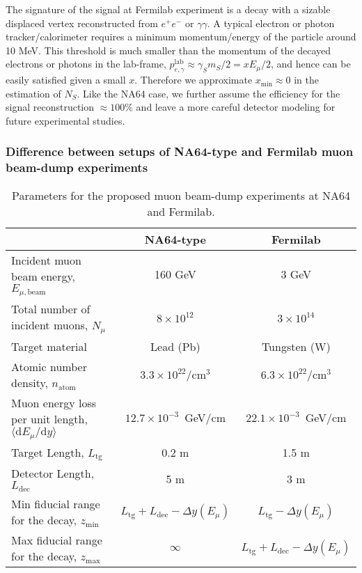 \documentclass[prd,onecolumn,notitlepage,
nofootinbib,aps,tightenlines,
preprintnumbers,amsmath,amssymb,amsfonts,showpacs,superscriptaddress]{revtex4-1}
\renewcommand{\d}{\text{d}}
\renewcommand{\d}{\text{d}}
\newcommand{\yz}[1]{\textcolor{blue}{\textbf{[YZ: #1]}}}
\begin{document}
The signature of the signal at Fermilab experiment is a decay with a sizable displaced vertex reconstructed from $e^+e^-$ or $\gamma \gamma$. A typical electron or photon tracker/calorimeter requires a minimum momentum/energy of the particle around 10 MeV.  This threshold is much smaller than the momentum of the decayed electrons or photons in the lab-frame, $p_{e,\gamma}^\text{lab}\approx \gamma_S m_S/2= x E_\mu/2$, and hence can be easily satisfied given a small $x$.  Therefore we approximate $x_\text{min}\approx 0$ in the estimation of $N_S$. Like the NA64 case, we further assume the efficiency for the signal reconstruction $\approx 100\%$ and leave a more careful detector modeling for future experimental studies.



\subsubsection{Difference between setups of NA64-type and Fermilab muon beam-dump experiments}

\begin{table}[htbp]
   \centering
   \begin{tabular}{@{} lcc @{}} %
      \hline
           & NA64-type & Fermilab\\
      \hline
      Incident muon beam energy, $E_{\mu, \text{beam}}$ &160 GeV & 3 GeV\\
      Total number of incident muons, $N_\mu$ & $8\times 10^{12}$ & $3\times 10^{14}$ \\
      Target material  &  Lead (Pb) & Tungsten (W)      \\
       Atomic number density, $n_\text{atom}$ & $3.3\times 10^{22}$/cm$^3$ & $6.3\times 10^{22}$/cm$^3$\\
 	Muon energy loss per unit length, $\langle \d E_\mu/\d y \rangle$ & $12.7\times 10^{-3}$~GeV/cm & $22.1\times 10^{-3}$~GeV/cm \\
	Target Length, $L_\text{tg}$  & 0.2 m  & 1.5 m \\
	 Detector Length, $L_\text{dec}$ & 5 m & 3 m\\
	 Min fiducial range for the decay, $z_{\min}$ & $L_\text{tg}+L_\text{dec}-\Delta y(E_\mu)$ &$L_\text{tg}-\Delta y(E_\mu)$ \\
	 Max fiducial range for the decay, $z_{\max}$ &  $\infty$ & $L_\text{tg}+L_\text{dec}-\Delta y(E_\mu)$ \\
      \hline
   \end{tabular}
   \caption{Parameters for the proposed muon beam-dump experiments at NA64 and Fermilab.}
   \label{twoexp}
\end{table}
\end{document}
